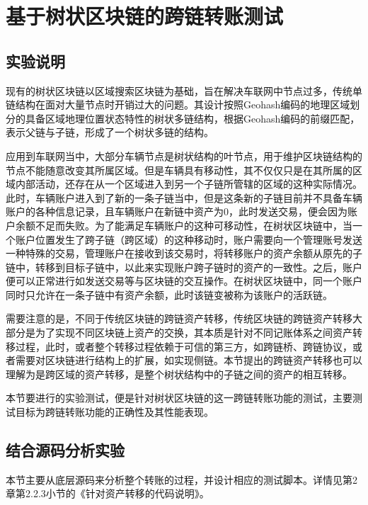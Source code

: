 
\chapter{基于树状区块链的跨链转账测试}

\section{实验说明}

现有的树状区块链以区域搜索区块链为基础，旨在解决车联网中节点过多，传统单链结构在面对大量节点时开销过大的问题。其设计按照Geohash编码的地理区域划分的具备区域地理位置状态特性的树状多链结构，根据Geohash编码的前缀匹配，表示父链与子链，形成了一个树状多链的结构。

应用到车联网当中，大部分车辆节点是树状结构的叶节点，用于维护区块链结构的节点不能随意改变其所属区域。但是车辆具有移动性，其不仅仅只是在其所属的区域内部活动，还存在从一个区域进入到另一个子链所管辖的区域的这种实际情况。此时，车辆账户进入到了新的一条子链当中，但是这条新的子链目前并不具备车辆账户的各种信息记录，且车辆账户在新链中资产为0，此时发送交易，便会因为账户余额不足而失败。为了能满足车辆账户的这种可移动性，在树状区块链中，当一个账户位置发生了跨子链（跨区域）的这种移动时，账户需要向一个管理账号发送一种特殊的交易，管理账户在接收到该交易时，将转移账户的资产余额从原先的子链中，转移到目标子链中，以此来实现账户跨子链时的资产的一致性。之后，账户便可以正常进行如发送交易等与区块链的交互操作。在树状区块链中，同一个账户同时只允许在一条子链中有资产余额，此时该链变被称为该账户的活跃链。

需要注意的是，不同于传统区块链的跨链资产转移，传统区块链的跨链资产转移大部分是为了实现不同区块链上资产的交换，其本质是针对不同记账体系之间资产转移过程，此时，或者整个转移过程依赖于可信的第三方，如跨链桥、跨链协议，或者需要对区块链进行结构上的扩展，如实现侧链。本节提出的跨链资产转移也可以理解为是跨区域的资产转移，是整个树状结构中的子链之间的资产的相互转移。

本节要进行的实验测试，便是针对树状区块链的这一跨链转账功能的测试，主要测试目标为跨链转账功能的正确性及其性能表现。

\section{结合源码分析实验}

本节主要从底层源码来分析整个转账的过程，并设计相应的测试脚本。详情见第2章第2.2.3小节的《针对资产转移的代码说明》。

